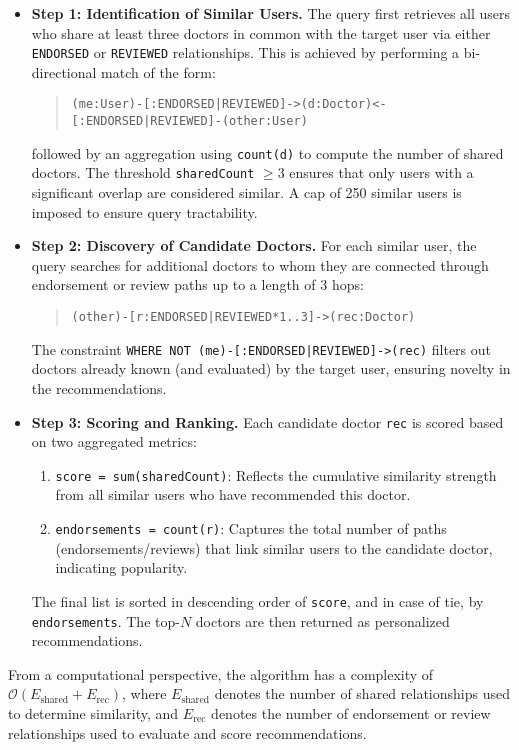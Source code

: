 \begin{itemize}
	\item \textbf{Step 1: Identification of Similar Users.} The query first retrieves all users who share at least three doctors in common with the target user via either \texttt{ENDORSED} or \texttt{REVIEWED} relationships. This is achieved by performing a bi-directional match of the form:
	\begin{quote}
		\texttt{(me:User)-[:ENDORSED|REVIEWED]->(d:Doctor)<-[:ENDORSED|REVIEWED]-(other:User)}
	\end{quote}
	followed by an aggregation using \texttt{count(d)} to compute the number of shared doctors. The threshold \texttt{sharedCount} $\geq 3$ ensures that only users with a significant overlap are considered similar. A cap of 250 similar users is imposed to ensure query tractability.
	
	\item \textbf{Step 2: Discovery of Candidate Doctors.} For each similar user, the query searches for additional doctors to whom they are connected through endorsement or review paths up to a length of 3 hops:
	\begin{quote}
		\texttt{(other)-[r:ENDORSED|REVIEWED*1..3]->(rec:Doctor)}
	\end{quote}
	The constraint \texttt{WHERE NOT (me)-[:ENDORSED|REVIEWED]->(rec)} filters out doctors already known (and evaluated) by the target user, ensuring novelty in the recommendations.
	
	\item \textbf{Step 3: Scoring and Ranking.} Each candidate doctor \texttt{rec} is scored based on two aggregated metrics:
	\begin{enumerate}
		\item \texttt{score = sum(sharedCount)}: Reflects the cumulative similarity strength from all similar users who have recommended this doctor.
		\item \texttt{endorsements = count(r)}: Captures the total number of paths (endorsements/reviews) that link similar users to the candidate doctor, indicating popularity.
	\end{enumerate}
	The final list is sorted in descending order of \texttt{score}, and in case of tie, by \texttt{endorsements}. The top-$N$ doctors are then returned as personalized recommendations.
	
\end{itemize}

From a computational perspective, the algorithm has a complexity of $\mathcal{O}(E_{\text{shared}} + E_{\text{rec}})$, where $E_{\text{shared}}$ denotes the number of shared relationships used to determine similarity, and $E_{\text{rec}}$ denotes the number of endorsement or review relationships used to evaluate and score recommendations.

